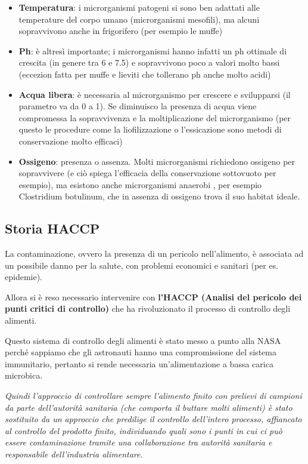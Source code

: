 \begin{itemize}
\item
  \textbf{Temperatura}: i microrganismi patogeni si sono ben adattati
  alle temperature del corpo umano (microrganismi mesofili), ma alcuni
  sopravvivono anche in frigorifero (per esempio le muffe)
\item
  \textbf{Ph}: è altresì importante; i microrganismi hanno infatti un ph
  ottimale di crescita (in genere tra 6 e 7.5) e sopravvivono poco a
  valori molto bassi (eccezion fatta per muffe e lieviti che tollerano
  ph anche molto acidi)
\item
  \textbf{Acqua libera}: è necessaria al microrganismo per crescere e
  svilupparsi (il parametro va da 0 a 1). Se diminuisco la presenza di
  acqua viene compromessa la sopravvivenza e la moltiplicazione del
  microrganismo (per questo le procedure come la liofilizzazione o
  l'essicazione sono metodi di conservazione molto efficaci)
\item
  \textbf{Ossigeno}: presenza o assenza. Molti microrganismi richiedono
  ossigeno per sopravvivere (e ciò spiega l'efficacia della
  conservazione sottovuoto per esempio), ma esistono anche microrganismi
  anaerobi , per esempio Clostridium botulinum, che in assenza di
  ossigeno trova il suo habitat ideale.
\end{itemize}

\subsection{Storia HACCP}

La contaminazione, ovvero la presenza di un pericolo nell'alimento, è
associata ad un possibile danno per la salute, con problemi economici e
sanitari (per es. epidemie).

Allora si è reso necessario intervenire con \textbf{l'HACCP (Analisi del
pericolo dei punti critici di controllo)} che ha rivoluzionato il
processo di controllo degli alimenti.

Questo sistema di controllo degli alimenti è stato messo a punto alla
NASA perché sappiamo che gli astronauti hanno una compromissione del
sistema immunitario, pertanto si rende necessaria un'alimentazione a
bassa carica microbica.

\emph{Quindi l'approccio di controllare sempre l'alimento finito con
prelievi di campioni da parte dell'autorità sanitaria (che comporta il
buttare molti alimenti) è stato sostituito da un approccio che predilige
il controllo dell'intero processo, affiancato al controllo del prodotto
finito, individuando quali sono i punti in cui ci può essere
contaminazione tramite una collaborazione tra autorità sanitaria e
responsabile dell'industria alimentare.}

